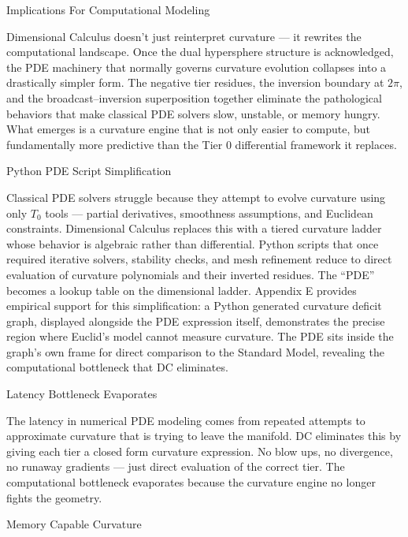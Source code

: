 \documentclass[final,onefignum,onetabnum]{siamart}
\begin{document}
\begin{section}{Implications For Computational Modeling}

Dimensional Calculus doesn’t just reinterpret curvature — it rewrites the computational landscape. Once the dual hypersphere structure is acknowledged, the PDE machinery that normally governs curvature evolution collapses into a drastically simpler form. The negative tier residues, the inversion boundary at $2\pi$, and the broadcast–inversion superposition together eliminate the pathological behaviors that make classical PDE solvers slow, unstable, or memory hungry. What emerges is a curvature engine that is not only easier to compute, but fundamentally more predictive than the Tier 0 differential framework it replaces.

\begin{subsection}{Python PDE Script Simplification}

Classical PDE solvers struggle because they attempt to evolve curvature using only $T_0$ tools — partial derivatives, smoothness assumptions, and Euclidean constraints. Dimensional Calculus replaces this with a tiered curvature ladder whose behavior is algebraic rather than differential. Python scripts that once required iterative solvers, stability checks, and mesh refinement reduce to direct evaluation of curvature polynomials and their inverted residues. The “PDE” becomes a lookup table on the dimensional ladder. Appendix E provides empirical support for this simplification: a Python generated curvature deficit graph, displayed alongside the PDE expression itself, demonstrates the precise region where Euclid’s model cannot measure curvature. The PDE sits inside the graph’s own frame for direct comparison to the Standard Model, revealing the computational bottleneck that DC eliminates.
\end{subsection}

\begin{subsection}{Latency Bottleneck Evaporates}

The latency in numerical PDE modeling comes from repeated attempts to approximate curvature that is trying to leave the manifold. DC eliminates this by giving each tier a closed form curvature expression. No blow ups, no divergence, no runaway gradients — just direct evaluation of the correct tier. The computational bottleneck evaporates because the curvature engine no longer fights the geometry.
\end{subsection}

\begin{subsection}{Memory Capable Curvature}


\end{subsection}
\end{section}
\end{document}

